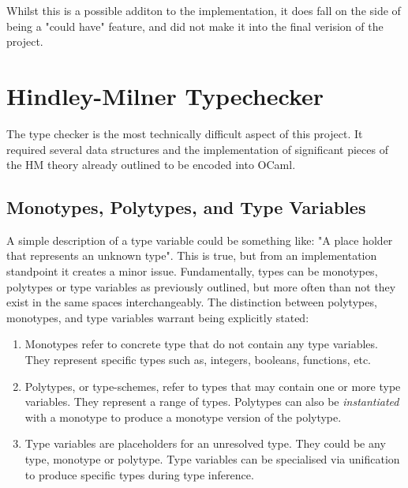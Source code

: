 \documentclass{l4proj}
\begin{document}
Whilst this is a possible additon to the implementation, it does fall on the side of being a "could have" feature, and did not make it into the final verision of the project.



\section{Hindley-Milner Typechecker} \label{sec:hindley-milner-typechecker}

The type checker is the most technically difficult aspect of this project.
It required several data structures and the implementation of significant pieces of the HM theory already outlined to be encoded into OCaml.

\subsection{Monotypes, Polytypes, and Type Variables}

A simple description of a type variable could be something like: "A place holder that represents an unknown type".
This is true, but from an implementation standpoint it creates a minor issue.
Fundamentally, types can be monotypes, polytypes or type variables as previously outlined, but more often than not they exist in the same spaces interchangeably.
The distinction between polytypes, monotypes, and type variables warrant being explicitly stated:

\begin{enumerate}
    \item Monotypes refer to concrete type that do not contain any type variables.
    They represent specific types such as, integers, booleans, functions, etc.

    \item Polytypes, or type-schemes, refer to types that may contain one or more type variables.
    They represent a range of types.
    Polytypes can also be \emph{instantiated} with a monotype to produce a monotype version of the polytype.

    \item Type variables are placeholders for an unresolved type.
    They could be any type, monotype or polytype.
    Type variables can be specialised via unification to produce specific types during type inference.
\end{enumerate}
\end{document}
